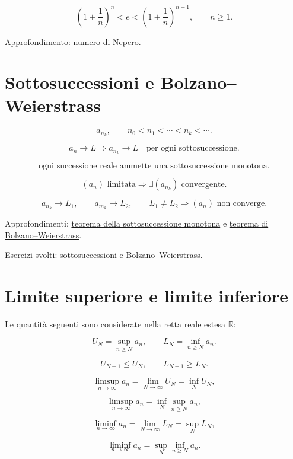 \[
\left(1+\frac1n\right)^n<e<\left(1+\frac1n\right)^{n+1},
\qquad n\ge1.
\]

Approfondimento: \href{https://ingegnerismo.it/matematica/numero-di-nepero/}{numero di Nepero}.

\section{Sottosuccessioni e Bolzano--Weierstrass}\label{sottosuccessioni-e-bolzanoweierstrass}

\[
a_{n_k},
\qquad
n_0<n_1<\cdots<n_k<\cdots.
\]

\[
a_n\to L
\Longrightarrow
a_{n_k}\to L
\quad\text{per ogni sottosuccessione}.
\]

\[
\text{ogni successione reale ammette una sottosuccessione monotona}.
\]

\[
(a_n)\text{ limitata}
\Longrightarrow
\exists(a_{n_k})\text{ convergente}.
\]

\[
a_{n_k}\to L_1,
\qquad
a_{m_k}\to L_2,
\qquad
L_1\ne L_2
\Longrightarrow
(a_n)\text{ non converge}.
\]

Approfondimenti: \href{https://ingegnerismo.it/matematica/sottosuccessione/\#teorema-della-sottosuccessione-monotona}{teorema della sottosuccessione monotona} e \href{https://ingegnerismo.it/matematica/teorema-di-bolzano-weierstrass/}{teorema di Bolzano--Weierstrass}.

Esercizi svolti: \href{https://ingegnerismo.it/matematica/sottosuccessioni-bolzano-esercizi/}{sottosuccessioni e Bolzano--Weierstrass}.

\section{Limite superiore e limite inferiore}\label{limite-superiore-e-limite-inferiore}

Le quantità seguenti sono considerate nella retta reale estesa \(\overline{\mathbb R}\):

\[
U_N=\sup_{n\ge N}a_n,
\qquad
L_N=\inf_{n\ge N}a_n.
\]

\[
U_{N+1}\le U_N,
\qquad
L_{N+1}\ge L_N.
\]

\[
\limsup_{n\to\infty}a_n
=\lim_{N\to\infty}U_N
=\inf_N U_N,
\]

\[
\limsup_{n\to\infty}a_n
=\inf_{N}\sup_{n\ge N}a_n,
\]

\[
\liminf_{n\to\infty}a_n
=\lim_{N\to\infty}L_N
=\sup_N L_N,
\]

\[
\liminf_{n\to\infty}a_n
=\sup_{N}\inf_{n\ge N}a_n.
\]

